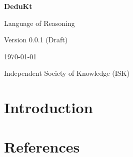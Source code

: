 \documentclass[11pt,oneside,a4paper]{book}
\theoremstyle{definition}
\theoremstyle{plain}
\theoremstyle{remark}
\begin{document}
    \begin{titlepage}
        \centering
        \vspace*{2cm}

        {\Huge\bfseries DeduKt \par}
        \vspace{1cm}
        {\Large Language of Reasoning \par}
        \vspace{2cm}

        {\Large Version 0.0.1 (Draft)\par}
        \vspace{0.5cm}
        {\large \today \par}

        \vfill

        {\Large Independent Society of Knowledge (ISK) \par}

    \end{titlepage}

    \tableofcontents


    
    \newpage
    
    \newpage
    
    \newpage
    
    \newpage
    
    \newpage
    
    \newpage
    

    \chapter{Introduction}\label{ch:introduction}
    
    
    
    
    
    

    \chapter{References}\label{ch:references}
    \printbibliography
\end{document}
